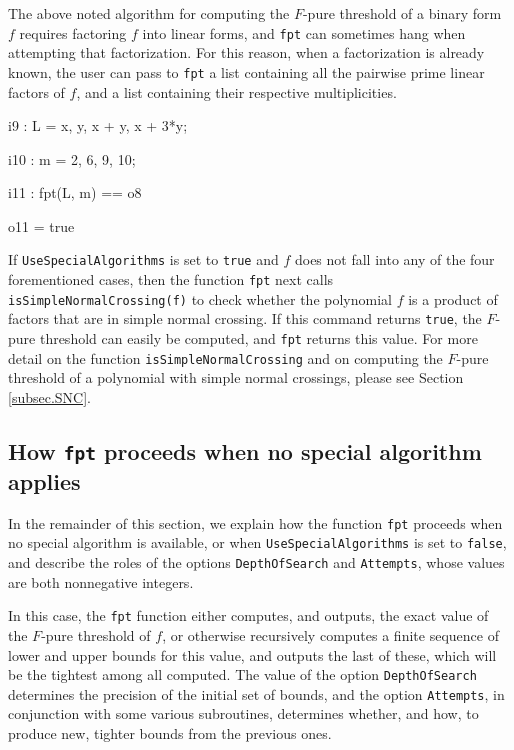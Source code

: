 \documentclass{amsart}
\begin{document}
The above noted algorithm for computing the $F$-pure threshold of a binary form $f$ requires factoring $f$ into linear forms, and {\tt fpt} can sometimes hang when attempting that factorization. For this reason, when a factorization is already known, the user can pass to {\tt fpt} a list containing all the pairwise prime linear factors of $f$, and a list containing their respective multiplicities.

{\small
{}
\begin{MyVerbatim}

i9 : L = {x, y, x + y, x + 3*y};

i10 : m = {2, 6, 9, 10};

i11 : fpt(L, m) == o8

o11 = true
\end{MyVerbatim}
}
\medspace

If {\tt UseSpecialAlgorithms} is set to {\tt true} and $f$ does not fall into any of the four forementioned cases, then the function {\tt fpt} next calls {\tt isSimpleNormalCrossing(f)} to check whether the polynomial $f$ is a product of factors that are in simple normal crossing.  If this command returns {\tt true}, the $F$-pure threshold can easily be computed, and {\tt fpt} returns this value.  For more detail on the function {\tt isSimpleNormalCrossing} and on computing the $F$-pure threshold of a polynomial with simple normal crossings, please see Section \ref{subsec.SNC}.


\subsection{How {\tt fpt} proceeds when no special algorithm applies}

In the remainder of this section, we explain how the function  {\tt fpt} proceeds when no special algorithm is available, or when {\tt UseSpecialAlgorithms} is set to {\tt false}, and describe the roles of the options {\tt DepthOfSearch} and {\tt Attempts}, whose values are both nonnegative integers.

In this case, the {\tt fpt} function either computes, and outputs, the exact value of the $F$-pure threshold of $f$, or otherwise recursively computes a finite sequence of lower and upper bounds for this value, and outputs the last of these, which will be the tightest among all computed.  The value of the option {\tt DepthOfSearch} determines the precision of the initial set of bounds, and the option {\tt Attempts}, in conjunction with some various subroutines, determines whether, and how, to produce new, tighter bounds from the previous ones.
\end{document}
